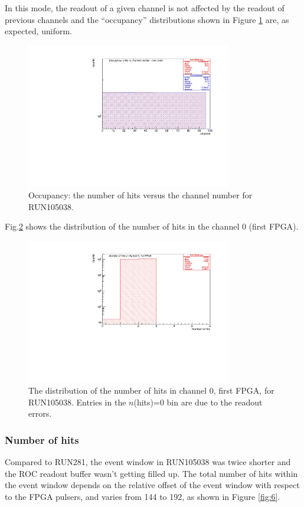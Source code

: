 In this mode, the readout of a given channel is not affected by the readout of previous
channels and the ``occupancy'' distributions shown in Figure \ref{fig:5} are, as expected, uniform.
\begin{figure}[!h]
\centering
\includegraphics[width =0.8\textwidth]{figures/pdf/figure_00002_nhitsvschannel_roc_simulation_2.pdf}
\caption{Occupancy: the number of hits versus the channel number for RUN105038.}
\label{fig:5}
\end{figure}


Fig.\ref{fig:67} shows the distribution of the number of hits in the channel 0 (first FPGA).
\begin{figure}[!h]
\centering
\includegraphics[width =0.8\textwidth]{figures/pdf/figure_00067_nhits_ch00_run105038.pdf}
\caption{
  The distribution of the number of hits in channel 0, first FPGA, for RUN105038.
  Entries in the $n$(hits)=0 bin are due to the readout errors.
}
\label{fig:67}
\end{figure}

\subsubsection{Number of hits}
Compared to RUN281, the event window in RUN105038 was twice shorter
and the ROC readout buffer wasn't getting filled up.
The total number of hits within the event window depends on the relative offset
of the event window with respect to the FPGA pulsers, and varies from
144 to 192, as shown in Figure \ref{fig:6}.

